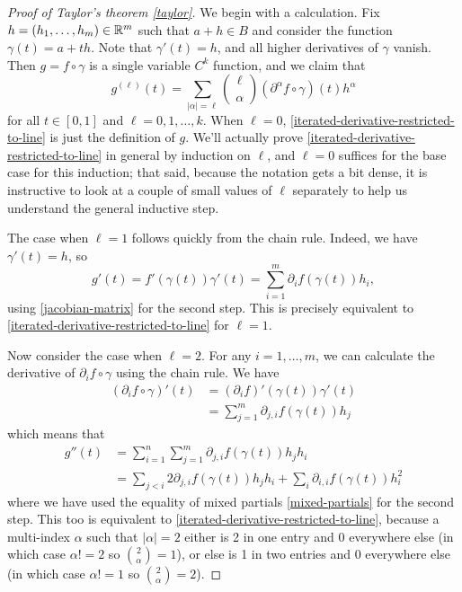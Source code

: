 \begin{proof}[Proof of Taylor's theorem \ref{taylor}]
	We begin with a calculation. Fix $h = (h_1, \dotsc, h_m) \in \mathbb{R}^m$ such that $a + h \in B$ and consider the function $\gamma(t) = a + th$. Note that $\gamma'(t) = h$, and all higher derivatives of $\gamma$ vanish. Then $g = f \circ \gamma$ is a single variable $C^k$ function, and we claim that 
	\begin{equation} \label{iterated-derivative-restricted-to-line} g^{(\ell)}(t) = \sum_{|\alpha| = \ell} \binom{\ell}{\alpha} (\partial^\alpha f \circ \gamma)(t) h^\alpha \end{equation}
	for all $t \in [0,1]$ and $\ell = 0, 1, \dotsc, k$. When $\ell = 0$, \cref{iterated-derivative-restricted-to-line} is just the definition of $g$. We'll actually prove \cref{iterated-derivative-restricted-to-line} in general by induction on $\ell$, and $\ell = 0$ suffices for the base case for this induction; that said, because the notation gets a bit dense, it is instructive to look at a couple of small values of $\ell$ separately to help us understand the general inductive step. 
	
	The case when $\ell = 1$ follows quickly from the chain rule. Indeed, we have $\gamma'(t) = h$, so
	\[ g'(t) = f'(\gamma(t))\gamma'(t) = \sum_{i = 1}^m \partial_i f(\gamma(t))h_i, \]
	using \cref{jacobian-matrix} for the second step. This is precisely equivalent to \cref{iterated-derivative-restricted-to-line} for $\ell = 1$. 
	
	Now consider the case when $\ell = 2$. For any $i = 1, \dotsc, m$, we can calculate the derivative of $\partial_i f \circ \gamma$ using the chain rule. We have
	\[ \begin{aligned} (\partial_i f \circ \gamma)'(t) &= (\partial_i f)'(\gamma(t))\gamma'(t) \\
	&= \sum_{j = 1}^m \partial_{j,i} f (\gamma(t)) h_j \end{aligned} \]
	which means that 
	\[ \begin{aligned} g''(t) &= \sum_{i = 1}^n \sum_{j = 1}^m \partial_{j,i} f(\gamma(t)) h_j h_i \\
	&= \sum_{j < i} 2\partial_{j,i}f(\gamma(t)) h_j h_i + \sum_i \partial_{i,i} f(\gamma(t)) h_i^2 \end{aligned} \]
	where we have used the equality of mixed partials \ref{mixed-partials} for the second step. This too is equivalent to \cref{iterated-derivative-restricted-to-line}, because a multi-index $\alpha$ such that $|\alpha| = 2$ either is 2 in one entry and 0 everywhere else (in which case $\alpha! = 2$ so $\binom{2}{\alpha} = 1$), or else is 1 in two entries and 0 everywhere else (in which case $\alpha! = 1$ so $\binom{2}{\alpha} = 2$).
	

\end{proof}
